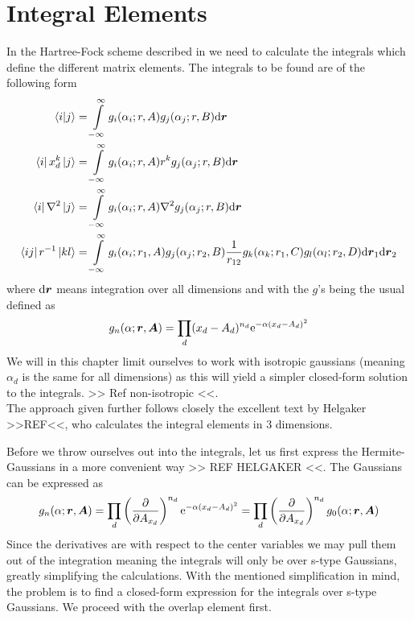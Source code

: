 \section{Integral Elements}
    In the Hartree-Fock scheme described in  we need to
    calculate the integrals which define the different matrix elements. The
    integrals to be found are of the following form
        \begin{equation}
            \begin{aligned}
                \braket{i}{j} &= \int\limits^{\infty}_{-\infty} g_i(\alpha_i;r,A)g_j(\alpha_j;r,B) \mathrm{d}
                \boldsymbol{{r}} \\
                \bra{i}x^k_d\ket{j} &= \int\limits^{\infty}_{-\infty} g_i(\alpha_i;r,A) r^k
                g_j(\alpha_j;r,B) \mathrm{d} \boldsymbol{{r}} \\
                \bra{i}\nabla^2\ket{j} &= \int\limits^{\infty}_{-\infty} g_i(\alpha_i;r,A)\nabla^2
                g_j(\alpha_j;r,B) \mathrm{d} \boldsymbol{{r}} \\
                \bra{ij}r^{-1}\ket{kl} &= \int\limits^{\infty}_{-\infty}
                g_i(\alpha_i;r_1,A)g_j(\alpha_j;r_2,B) \frac{1}{r_{12}}
                g_k(\alpha_k;r_1,C)g_l(\alpha_l;r_2,D) \mathrm{d} \boldsymbol{{r}}_1 \mathrm{d}
                \boldsymbol{{r}}_2\\
            \end{aligned}
        \end{equation}
    where $\mathrm{d}\boldsymbol{{r}}$ means integration over all dimensions and with the
    $g$'s being the usual  defined as
        \begin{equation}
            g_n(\alpha;\boldsymbol{{r}},\boldsymbol{{A}}) = \prod_d (x_d-A_d)^{n_d}
            \mathrm{e}^{-\alpha (x_d-A_d)^2}
            \label{eq:hermiteGauss2}
        \end{equation}
    We will in this chapter limit ourselves to work with isotropic gaussians
    (meaning $\alpha_d$ is the same for all dimensions) as this will yield a
    simpler closed-form solution to the integrals. >> Ref non-isotropic <<. \\
    The approach given further follows closely the excellent text by Helgaker
    >>REF<<, who calculates the integral elements in 3 dimensions.

    Before we throw ourselves out into the integrals, let us first express the
    Hermite-Gaussians in a more convenient way >> REF HELGAKER <<. The
    Gaussians can be expressed as
        \begin{equation}
            g_n(\alpha;\boldsymbol{{r}},\boldsymbol{{A}}) = \prod_d  \left(\frac{\mathrm{\partial}}{\mathrm{\partial} A_{x_d}}\right)^{n_d}
            \mathrm{e}^{-\alpha (x_d-A_d)^2} = \prod_d \left(\frac{\mathrm{\partial}}{\mathrm{\partial} A_{x_d}}\right)^{n_d}
            g_0(\alpha;\boldsymbol{{r}},\boldsymbol{{A}})
        \end{equation}
    Since the derivatives are with respect to the center variables we may pull
    them out of the integration meaning the integrals will only be over s-type
    Gaussians, greatly simplifying the calculations. With the mentioned
    simplification in mind, the problem is to find a closed-form expression for
    the integrals over s-type Gaussians. We proceed with the overlap element first.

